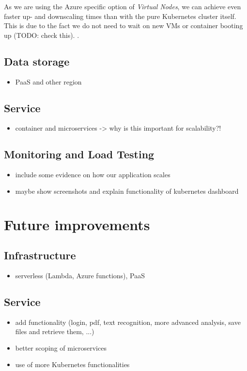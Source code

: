 \documentclass[conference]{IEEEtran}
\begin{document}
As we are using the Azure specific option of \textit{Virtual Nodes}, we can achieve even faster up- and downscaling times
than with the pure Kubernetes cluster itself. This is due to the fact we do not need to wait on new VMs or container booting up (TODO: check this).
\cite{MicrosoftVirtualNode}.

\subsection{Data storage}
\begin{itemize}
	\item PaaS and other region
\end{itemize}

\subsection{Service}
\begin{itemize}
	\item container and microservices -> why is this important for scalability?!
\end{itemize}

\subsection{Monitoring and Load Testing}
\begin{itemize}
	\item include some evidence on how our application scales
	\item maybe show screenshots and explain functionality of kubernetes dashboard
\end{itemize}

\section{Future improvements}
\label{sec:future-improvments}
\subsection{Infrastructure}
\begin{itemize}
	\item serverless (Lambda, Azure functions),  PaaS
\end{itemize}

\subsection{Service}
\begin{itemize}
	\item add functionality (login, pdf, text recognition, more advanced analysis, save files and retrieve them, ...)
	\item better scoping of microservices
	\item use of more Kubernetes functionalities
\end{itemize}
\end{document}
